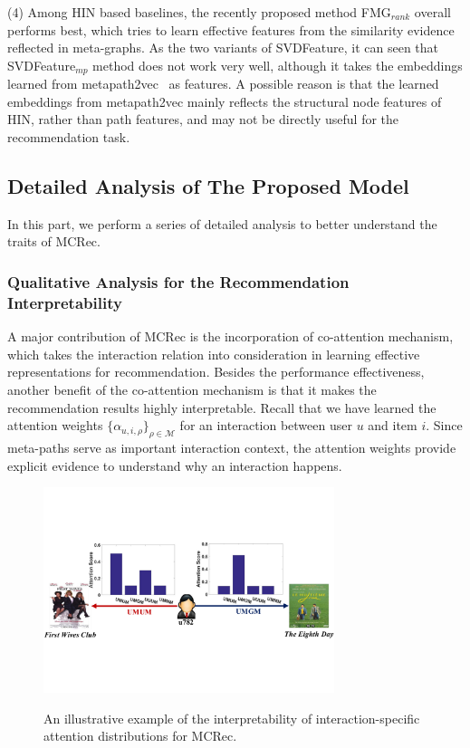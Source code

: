 (4) Among HIN based baselines, the recently proposed method FMG$_{rank}$ overall performs best, which tries to learn effective features from the similarity evidence reflected in meta-graphs. As the two variants of SVDFeature, it can seen that SVDFeature$_{mp}$ method does not work very well, although it takes the embeddings learned from metapath2vec~\cite{dong2017metapath2vec} as features. A possible reason is that the learned embeddings from metapath2vec mainly reflects the  structural node features of HIN, rather than path features, and may not be directly useful for the recommendation task.





\subsection{Detailed Analysis of The Proposed Model}
In this part, we perform a series of detailed analysis to better understand the traits of MCRec.


\subsubsection{Qualitative Analysis for the Recommendation Interpretability}  A major contribution of MCRec is the incorporation of co-attention mechanism, which takes the interaction relation into consideration in learning effective representations for recommendation.
Besides the performance effectiveness, another  benefit of the co-attention mechanism is that it makes the recommendation results highly interpretable.
Recall that we have learned the attention weights $\{ \alpha_{u,i,\rho} \}_{\rho \in \mathcal{M}}$ for an interaction between user $u$ and item $i$.
Since meta-paths serve as  important interaction context, the attention weights provide explicit evidence to understand why an interaction happens.

\begin{figure}
  \includegraphics[width=8.5cm]{image/cs_782_2.pdf}\\
  \caption{An illustrative example of the interpretability of interaction-specific attention distributions for MCRec.  \label{fig-casestudy}}
\end{figure}


